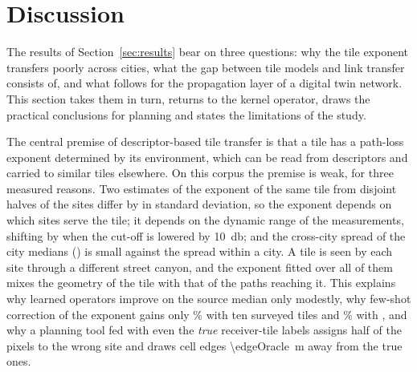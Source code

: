 \section{Discussion}
\label{sec:discussion}

The results of Section~\ref{sec:results} bear on three questions: why the
tile exponent transfers poorly across cities, what the gap between tile
models and link transfer consists of, and what follows for the propagation
layer of a digital twin network. This section takes them in turn, returns
to the kernel operator, draws the practical conclusions for planning and
states the limitations of the study.

The central premise of descriptor-based tile transfer is that a tile has a
path-loss exponent determined by its environment, which can be read from
descriptors and carried to similar tiles elsewhere. On this corpus the
premise is weak, for three measured reasons. Two estimates of the exponent
of the same tile from disjoint halves of the sites differ by
\seSplitDiff{} in standard deviation, so the exponent depends on which
sites serve the tile; it depends on the dynamic range of the measurements,
shifting by \censDgOneForty{} when the cut-off is lowered by
\SI{10}{\decibel}; and the cross-city spread of the city medians
(\betweenSd) is small against the spread within a city. A tile is seen by
each site through a different street canyon, and the exponent fitted over
all of them mixes the geometry of the tile with that of the paths reaching
it. This explains why learned operators improve on the source median only
modestly, why few-shot correction of the exponent gains only \fsGainGbdt\%
with ten surveyed tiles and \fsGainMaxGbdt\% with \fsKmax, and why a
planning tool fed with even the \emph{true} receiver-tile labels assigns
half of the pixels to the wrong site and draws cell edges
\SI{\edgeOracle}{\metre} away from the true ones.

